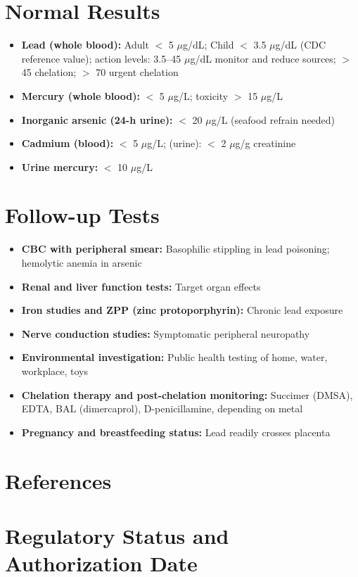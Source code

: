 \section*{Normal Results}
\begin{itemize}
  \item \textbf{Lead (whole blood):} Adult $<$ 5 $\mu$g/dL; Child $<$ 3.5 $\mu$g/dL (CDC reference value); action levels: 3.5--45 $\mu$g/dL monitor and reduce sources; $>$ 45 chelation; $>$ 70 urgent chelation
  \item \textbf{Mercury (whole blood):} $<$ 5 $\mu$g/L; toxicity $>$ 15 $\mu$g/L
  \item \textbf{Inorganic arsenic (24-h urine):} $<$ 20 $\mu$g/L (seafood refrain needed)
  \item \textbf{Cadmium (blood):} $<$ 5 $\mu$g/L; (urine): $<$ 2 $\mu$g/g creatinine
  \item \textbf{Urine mercury:} $<$ 10 $\mu$g/L
\end{itemize}

\section*{Follow-up Tests}
\begin{itemize}
  \item \textbf{CBC with peripheral smear:} Basophilic stippling in lead poisoning; hemolytic anemia in arsenic
  \item \textbf{Renal and liver function tests:} Target organ effects
  \item \textbf{Iron studies and ZPP (zinc protoporphyrin):} Chronic lead exposure
  \item \textbf{Nerve conduction studies:} Symptomatic peripheral neuropathy
  \item \textbf{Environmental investigation:} Public health testing of home, water, workplace, toys
  \item \textbf{Chelation therapy and post-chelation monitoring:} Succimer (DMSA), EDTA, BAL (dimercaprol), D-penicillamine, depending on metal \cite{acmt2010position}
  \item \textbf{Pregnancy and breastfeeding status:} Lead readily crosses placenta
\end{itemize}

\section*{References}



\clearpage
\section*{Regulatory Status and Authorization Date}

\clearpage
